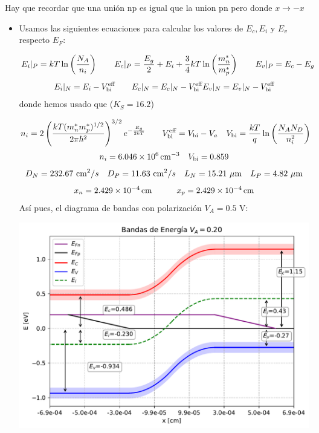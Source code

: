 Hay que recordar que una unión np es igual que la union pn pero donde $x\rightarrow -x$
\begin{itemize}
    \item Usamos las siguientes ecuaciones para calcular los valores de $E_c,E_i$ y $E_v$ respecto $E_F$: 
    
    \begin{equation*}
        E_i|_P =  k T \ln \left( \frac{N_A}{n_i} \right) \qquad E_c|_P = \frac{E_g}{2} + E_i + \frac{3}{4} kT \ln \left( \frac{m_n^*}{m_p^*} \right) \qquad E_v |_P = E_c - E_g
    \end{equation*}
    \begin{equation*}
        E_i|_N = E_i - V_{\text{bi}}^\text{eff}  \qquad E_c|_N = E_c|_N - V_{\text{bi}}^\text{eff} E_v |_N = E_v|_N - V_{\text{bi}}^\text{eff} 
    \end{equation*}
    donde hemos usado que ($K_S=16.2$)

    \begin{equation*}
        n_i = 2 \left( \frac{kT (m_n^* m_p^* )^{1/2}}{2\pi \hbar^2} \right)^{3/2} e^{-\frac{E_g}{2kT}} 
    \qquad V_{\text{bi}}^{\text{eff}} = V_{\text{bi}} - V_a \quad V_{\text{bi}} = \frac{kT}{q} \ln \left( \frac{N_AN_D}{n_i^2} \right)
    \end{equation*}
    \begin{equation}
        n_i=\SI{6.046e+6}{cm^{-3}} \quad V_{\text{bi}} = 0.859 
    \end{equation}
    \begin{equation}
        D_N = 232.67 \ \cm^2/s \quad D_P =  11.63 \ \cm^2/s \quad L_N = 15.21 \ \mu \unit{m} \quad L_P = 4.82 \  \mu \unit{m}
    \end{equation}
    \begin{equation}
        x_n = \SI{2.429e-4}{cm} \quad \quad \quad 
        x_p = \SI{2.429e-4}{cm}  
    \end{equation}
    Así pues, el diagrama de bandas con polarización $V_A=0.5$ V: 

    \begin{center} 
        \includegraphics[width=0.6\linewidth]{Ejercicios/Ch_03/03_06_01.pdf}
    \end{center}
    


\end{itemize}
